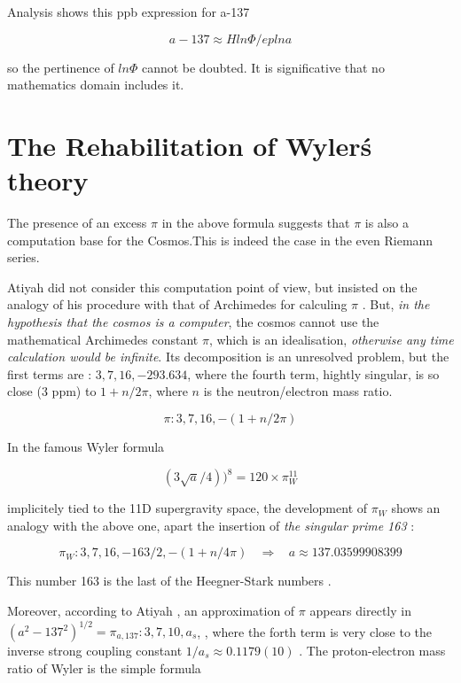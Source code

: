 \documentclass[a4paper,9pt]{article}
\begin{document}
Analysis shows this ppb expression for a-137

\begin{equation}
   a - 137 \approx H ln\Phi /eplna
\end{equation}

so the pertinence of $ln\Phi$ cannot be doubted. It is significative that no mathematics domain includes it.
  
\section{The Rehabilitation of Wyler\'s theory}
The presence of an excess $\pi$ in the above formula suggests that $\pi$ is also a computation base for the Cosmos.This is indeed the case in the even Riemann series.


Atiyah did not consider this computation point of view, but insisted on the analogy of his procedure with that of Archimedes for calculing $\pi$ \cite{Atiyah}. But, \textit {in the hypothesis that the cosmos is a computer}, the cosmos cannot use the mathematical Archimedes constant $\pi$, which is an idealisation, \textit {otherwise any time calculation would be infinite}. Its decomposition is an unresolved problem, but the first terms are : $3, 7, 16, -293.634$, where the fourth term, hightly singular, is so close (3 ppm) to $1 + n/2\pi$, where $n$ is the neutron/electron mass ratio.

\begin{equation}
\pi : 3, 7, 16, -(1+n/2\pi)
\end{equation}


In the famous Wyler formula \cite{Wyler} 

\begin{equation}
(3\sqrt a/4))^8 = 120 \times \pi_W^{11}
\end{equation}


implicitely tied to the 11D supergravity space, the development of  $\pi_W$ shows an analogy with the above one, apart the insertion of \textit {the singular prime 163} :

\begin{equation}
\pi_W : 3, 7, 16,- 163/2, -(1+n/4\pi) ~~~~\Rightarrow ~~~~    a \approx 137.03599908399
\end{equation}


This number 163 is the last of the Heegner-Stark numbers \cite{Stark}. 


Moreover, according to Atiyah \cite{Atiyah1}, an approximation of $\pi$ appears directly in $(a^2-137^2)^{1/2} = \pi_{a,137} : 3, 7, 10, a_s$, , where the forth term is very close to the inverse strong coupling constant $1/a_s \approx 0.1179(10)$ \cite{Tanabashi}. The proton-electron mass ratio of Wyler \cite{Wyler} is the simple formula 
\end{document}
